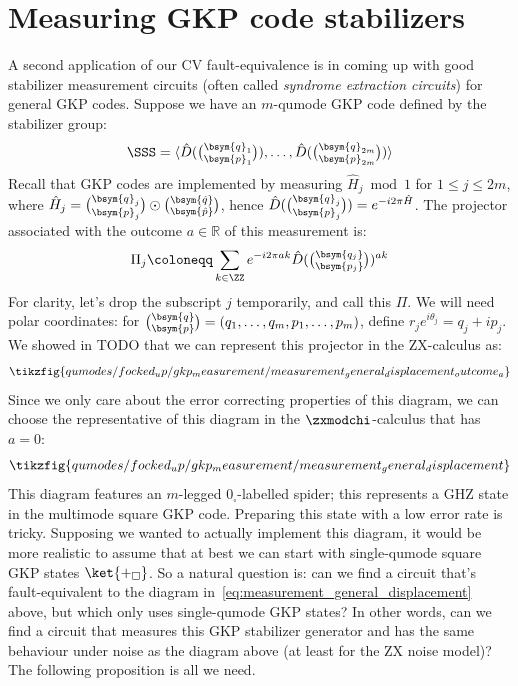\section{Measuring GKP code stabilizers}

A second application of our CV fault-equivalence is in coming up with good stabilizer measurement circuits (often called \textit{syndrome extraction circuits}) for general GKP codes.
Suppose we have an $m$-qumode GKP code defined by the stabilizer group:
\begin{equation}
    \SSS = \langle \hat{D}(\tbinom{\bsym{q}_1}{\bsym{p}_1}), \ldots, \hat{D}(\tbinom{\bsym{q}_{2m}}{\bsym{p}_{2m}}) \rangle
\end{equation}
Recall that GKP codes are implemented by measuring $\hat{H}_j \bmod 1$ for $1 \leq j \leq 2m$, where $\hat{H}_j = \tbinom{\bsym{q}_j}{\bsym{p}_j} \odot \tbinom{\bsym{\hat{q}}}{\bsym{\hat{p}}}$, hence $\hat{D}(\tbinom{\bsym{q}_j}{\bsym{p}_j}) = e^{-i2\pi\hat{H}}$.
The projector associated with the outcome $a \in \mathbb{R}$ of this measurement is:
\begin{equation}
    \Pi_j \coloneqq \sum_{k \in \ZZ} e^{-i2\pi a k}\hat{D}(\tbinom{\bsym{q_j}}{\bsym{p_j}})^{a k}
\end{equation}
For clarity, let's drop the subscript $j$ temporarily, and call this $\Pi$.
We will need polar coordinates: for $\tbinom{\bsym{q}}{\bsym{p}} = (q_1, \ldots, q_m, p_1, \ldots, p_m)$, define $r_j e^{i\theta_j} = q_j + ip_j$.
We showed in TODO that we can represent this projector in the ZX-calculus as:
\begin{equation}
    \tikzfig{qumodes/focked_up/gkp_measurement/measurement_general_displacement_outcome_a}
\end{equation}
Since we only care about the error correcting properties of this diagram, we can choose the representative of this diagram in the $\zxmodchi$-calculus that has $a = 0$:
\begin{equation}\label{eq:measurement_general_displacement}
    \tikzfig{qumodes/focked_up/gkp_measurement/measurement_general_displacement}
\end{equation}
This diagram features an $m$-legged $0_\square$-labelled spider; this represents a GHZ state in the multimode square GKP code.
Preparing this state with a low error rate is tricky.
Supposing we wanted to actually implement this diagram, it would be more realistic to assume that at best we can start with single-qumode square GKP states $\ket{+_\square}$.
So a natural question is: can we find a circuit that's fault-equivalent to the diagram in~\eqref{eq:measurement_general_displacement} above, but which only uses single-qumode GKP states?
In other words, can we find a circuit that measures this GKP stabilizer generator and has the same behaviour under noise as the diagram above (at least for the ZX noise model)?
The following proposition is all we need.

